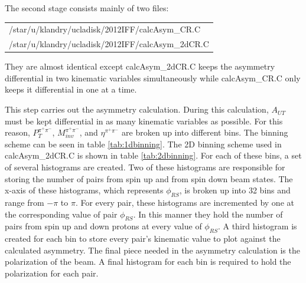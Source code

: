 \documentclass[abstract = on,listof=totoc, bibliography=totoc]{scrreprt}
\newcommand{\phirs}{\phi_{RS}}
\newcommand{\ptpair}{P_{T}^{\pi^+\pi^-}}
\newcommand{\mpair}{M_{inv}^{\pi^+\pi^-}}
\newcommand{\etapair}{\eta^{\pi^+\pi^-}}
\begin{document}
The second stage consists mainly of two files:
\begin{center}
\footnotesize
\begin{tabular}{l}
/star/u/klandry/ucladisk/2012IFF/calcAsym\_CR.C  \\
/star/u/klandry/ucladisk/2012IFF/calcAsym\_2dCR.C \\
\end{tabular}
\end{center}
They are almost identical except calcAsym\_2dCR.C keeps the asymmetry differential in two kinematic variables simultaneously while calcAsym\_CR.C only keeps it differential in one at a time. 

This step carries out the asymmetry calculation. During this calculation, $A_{UT}$ must be kept differential in as many kinematic variables as possible. For this reason, $\ptpair$, $\mpair$, and $\etapair$ are broken up into different bins. The binning scheme can be seen in table \ref{tab:1dbinning}. The 2D binning scheme used in calcAsym\_2dCR.C is shown in table \ref{tab:2dbinning}. For each of these bins, a set of several histograms are created. Two of these histograms are responsible for storing the number of pairs from spin up and from spin down beam states. The x-axis of these histograms, which represents $\phirs$, is broken up into 32 bins and range from $-\pi$ to $\pi$. For every pair, these histograms are incremented by one at the corresponding value of pair $\phirs$. In this manner they hold the number of pairs from spin up and down protons at every value of $\phirs$. A third histogram is created for each bin to store every pair's kinematic value to plot against the calculated asymmetry. The final piece needed in the asymmetry calculation is the polarization of the beam. A final histogram for each bin is required to hold the polarization for each pair. 
\end{document}
